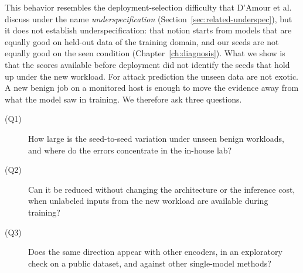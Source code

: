 This behavior resembles the deployment-selection difficulty that
D'Amour et al.~\cite{damour2020underspecification} discuss under the
name \emph{underspecification} (Section~\ref{sec:related-underspec}),
but it does not establish underspecification: that notion starts from
models that are equally good on held-out data of the training domain,
and our seeds are not equally good on the seen condition
(Chapter~\ref{ch:diagnosis}).
What we show is that the scores available
before deployment did not identify the seeds that hold up under the new
workload. For attack prediction the unseen data are
not exotic. A new benign job on a monitored host is enough to move the
evidence away from what the model saw in training. We therefore ask
three questions.
\begin{description}
  \item[(Q1)] How large is the seed-to-seed variation under unseen
    benign workloads, and where do the errors concentrate in the
    in-house lab?
  \item[(Q2)] Can it be reduced without changing the architecture or the
    inference cost, when unlabeled inputs from the new workload are
    available during training?
  \item[(Q3)] Does the same direction appear with other encoders, in
    an exploratory check on a public dataset, and against other
    single-model methods?
\end{description}


